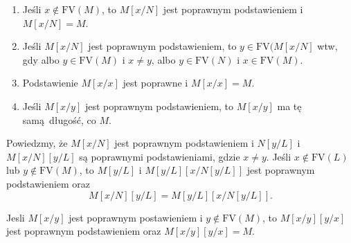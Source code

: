 \begin{definicja}
\begin{itemize}
\begin{fakt}
      \begin{enumerate}[label=({\alph*})]
        \item Jeśli \(x\not\in\mathrm{FV}(M)\), to \(M[x/N]\) jest poprawnym podstawieniem i \(M[x/N]=M\).
        \item Jeśli \(M[x/N]\) jest poprawnym podstawieniem, to \(y\in\mathrm{FV}(M[x/N]\) wtw, gdy albo \(y\in\mathrm{FV}(M)\)
          i \(x\neq y\), albo \(y\in \mathrm{FV}(N)\) i \(x\in \mathrm{FV}(M)\). 
        \item Podstawienie \(M[x/x]\) jest poprawne i \(M[x/x]=M\).
        \item Jeśli \(M[x/y]\) jest poprawnym podstawieniem, to \(M[x/y]\) ma tę samą długość, co \(M\).
      \end{enumerate}
    \end{fakt}
    \begin{fakt}
      Powiedzmy, że \(M[x/N]\) jest poprawnym podstawieniem i \(N[y/L]\) i \(M[x/N][y/L]\) są poprawnymi podstawieniami, gdzie
      \(x\neq y\). Jeśli \(x\not\in \mathrm{FV}(L)\) lub \(y\not\in\mathrm{FV}(M)\), to \(M[y/L]\) i \( M[y/L]\left[x/N[y/L]\right] \) jest poprawnym podstawieniem oraz
      \[
        M[x/N][y/L]=M[y/L][x/N[y/L]].
      \]
    \end{fakt}

    \begin{fakt}
      Jesli \(M[x/y]\) jest poprawnym postawieniem i \(y\not\in\mathrm{FV}(M)\), to \(M[x/y][y/x]\) jest poprawnym podstawieniem oraz
      \(M[x/y][y/x]=M\).
    \end{fakt}


\end{itemize}
\end{definicja}
